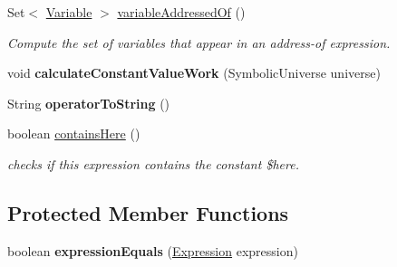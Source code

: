 \begin{DoxyCompactItemize}
Set$<$ \hyperlink{interfaceedu_1_1udel_1_1cis_1_1vsl_1_1civl_1_1model_1_1IF_1_1variable_1_1Variable}{Variable} $>$ \hyperlink{classedu_1_1udel_1_1cis_1_1vsl_1_1civl_1_1model_1_1common_1_1expression_1_1CommonUnaryExpression_a16a076fd5725e8f46d0e862d0c7ee771}{variable\+Addressed\+Of} ()
\begin{DoxyCompactList}\small\item\em Compute the set of variables that appear in an address-\/of expression. \end{DoxyCompactList}\item 
\hypertarget{classedu_1_1udel_1_1cis_1_1vsl_1_1civl_1_1model_1_1common_1_1expression_1_1CommonUnaryExpression_afef0f88254fdbd55d97c9519df490605}{}void {\bfseries calculate\+Constant\+Value\+Work} (Symbolic\+Universe universe)\label{classedu_1_1udel_1_1cis_1_1vsl_1_1civl_1_1model_1_1common_1_1expression_1_1CommonUnaryExpression_afef0f88254fdbd55d97c9519df490605}

\item 
\hypertarget{classedu_1_1udel_1_1cis_1_1vsl_1_1civl_1_1model_1_1common_1_1expression_1_1CommonUnaryExpression_a09746e74dea12d3a21b1e0f508511640}{}String {\bfseries operator\+To\+String} ()\label{classedu_1_1udel_1_1cis_1_1vsl_1_1civl_1_1model_1_1common_1_1expression_1_1CommonUnaryExpression_a09746e74dea12d3a21b1e0f508511640}

\item 
boolean \hyperlink{classedu_1_1udel_1_1cis_1_1vsl_1_1civl_1_1model_1_1common_1_1expression_1_1CommonUnaryExpression_af8b5dd134d7b1b840b28549b657acb7f}{contains\+Here} ()
\begin{DoxyCompactList}\small\item\em checks if this expression contains the constant \$here. \end{DoxyCompactList}\end{DoxyCompactItemize}
\subsection*{Protected Member Functions}
\begin{DoxyCompactItemize}
\item 
\hypertarget{classedu_1_1udel_1_1cis_1_1vsl_1_1civl_1_1model_1_1common_1_1expression_1_1CommonUnaryExpression_a3474dfcddb087c0159c64a0e53d9499d}{}boolean {\bfseries expression\+Equals} (\hyperlink{interfaceedu_1_1udel_1_1cis_1_1vsl_1_1civl_1_1model_1_1IF_1_1expression_1_1Expression}{Expression} expression)\label{classedu_1_1udel_1_1cis_1_1vsl_1_1civl_1_1model_1_1common_1_1expression_1_1CommonUnaryExpression_a3474dfcddb087c0159c64a0e53d9499d}

\end{DoxyCompactItemize}
